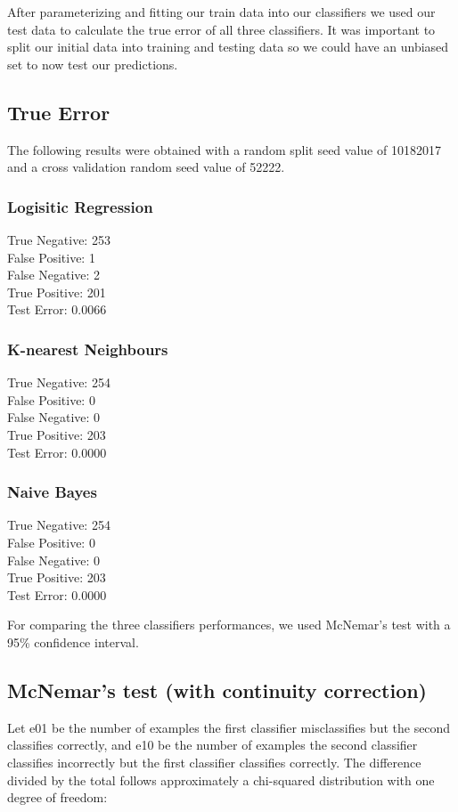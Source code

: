 \documentclass[a4paper]{article}
\newcommand\tab[1][1cm]{\hspace*{#1}}
\begin{document}
After parameterizing and fitting our train data into our classifiers we used our test data to calculate the true error of all
three classifiers.
It was important to split our initial data into training and testing data so we could have an unbiased set to now test our predictions.

\subsection{True Error}

The following results were obtained with a random split seed value of 10182017 and a cross validation random seed value of 52222.

\subsubsection{Logisitic Regression}
	\tab True Negative: 253\\
        	\tab False Positive: 1\\
        	\tab False Negative: 2\\
        	\tab True Positive: 201\\
        	\tab Test Error: 0.0066

\subsubsection{K-nearest Neighbours}
	\tab True Negative: 254\\
        	\tab False Positive: 0\\
        	\tab False Negative: 0\\
        	\tab True Positive: 203\\
        	\tab Test Error: 0.0000

\subsubsection{Naive Bayes}
        \tab True Negative: 254\\
        \tab False Positive: 0\\
        \tab False Negative: 0\\
        \tab True Positive: 203\\
        \tab Test Error: 0.0000

\bigbreak
For comparing the three classifiers performances, we used McNemar's test with a 95\% confidence interval.

\subsection{McNemar's test (with continuity correction)}
Let e01 be the number of examples the first classifier
misclassifies but the second classifies correctly, and e10 be the number of examples the second classifier
classifies incorrectly but the first classifier classifies correctly. The difference divided by the total
follows approximately a chi-squared distribution with one degree of freedom:
\end{document}
